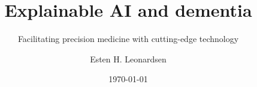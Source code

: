 \documentclass{beamer}
\title{Explainable AI and dementia}
\subtitle{Facilitating precision medicine with cutting-edge technology}
\date{\today}
\author{Esten H. Leonardsen}
\begin{document}
    \begin{frame}
        \titlepage
    \end{frame}

    
    
\end{document}

